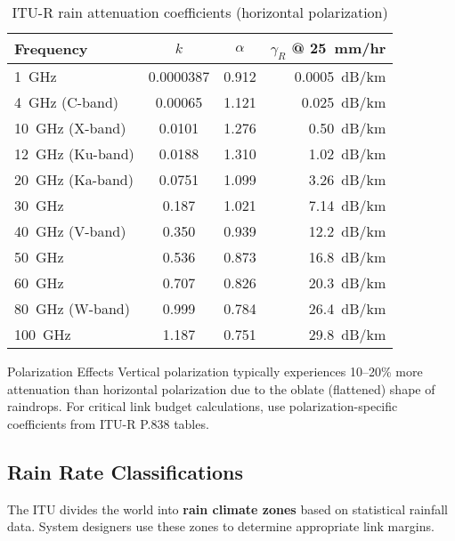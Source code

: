 \begin{table}[h!]
\centering
\caption{ITU-R rain attenuation coefficients (horizontal polarization)}
\label{tab:itu-rain-coeffs}
\begin{tabular}{@{}lccr@{}}
\toprule
Frequency & $k$ & $\alpha$ & $\gamma_R$ @ 25~mm/hr \\
\midrule
1~GHz & 0.0000387 & 0.912 & 0.0005~dB/km \\
4~GHz (C-band) & 0.00065 & 1.121 & 0.025~dB/km \\
10~GHz (X-band) & 0.0101 & 1.276 & 0.50~dB/km \\
12~GHz (Ku-band) & 0.0188 & 1.310 & 1.02~dB/km \\
20~GHz (Ka-band) & 0.0751 & 1.099 & 3.26~dB/km \\
30~GHz & 0.187 & 1.021 & 7.14~dB/km \\
40~GHz (V-band) & 0.350 & 0.939 & 12.2~dB/km \\
50~GHz & 0.536 & 0.873 & 16.8~dB/km \\
60~GHz & 0.707 & 0.826 & 20.3~dB/km \\
80~GHz (W-band) & 0.999 & 0.784 & 26.4~dB/km \\
100~GHz & 1.187 & 0.751 & 29.8~dB/km \\
\bottomrule
\end{tabular}
\end{table}

\begin{calloutbox}{Polarization Effects}
Vertical polarization typically experiences 10--20\% more attenuation than horizontal polarization due to the oblate (flattened) shape of raindrops. For critical link budget calculations, use polarization-specific coefficients from ITU-R P.838 tables.
\end{calloutbox}

\subsection{Rain Rate Classifications}

The ITU divides the world into \textbf{rain climate zones} based on statistical rainfall data. System designers use these zones to determine appropriate link margins.


